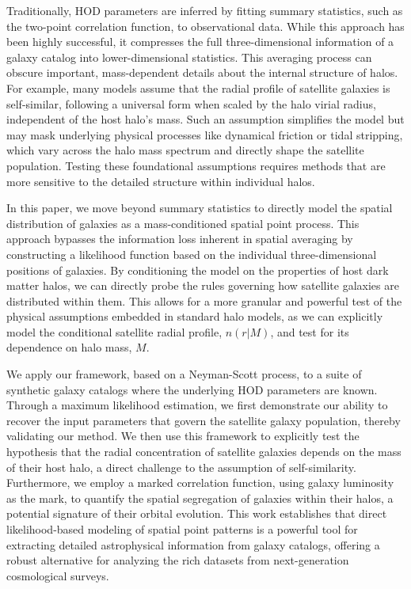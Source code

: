 \documentclass[]{article}
\begin{document}
Traditionally, HOD parameters are inferred by fitting summary statistics, such as the two-point correlation function, to observational data. While this approach has been highly successful, it compresses the full three-dimensional information of a galaxy catalog into lower-dimensional statistics. This averaging process can obscure important, mass-dependent details about the internal structure of halos. For example, many models assume that the radial profile of satellite galaxies is self-similar, following a universal form when scaled by the halo virial radius, independent of the host halo's mass. Such an assumption simplifies the model but may mask underlying physical processes like dynamical friction or tidal stripping, which vary across the halo mass spectrum and directly shape the satellite population. Testing these foundational assumptions requires methods that are more sensitive to the detailed structure within individual halos.

In this paper, we move beyond summary statistics to directly model the spatial distribution of galaxies as a mass-conditioned spatial point process. This approach bypasses the information loss inherent in spatial averaging by constructing a likelihood function based on the individual three-dimensional positions of galaxies. By conditioning the model on the properties of host dark matter halos, we can directly probe the rules governing how satellite galaxies are distributed within them. This allows for a more granular and powerful test of the physical assumptions embedded in standard halo models, as we can explicitly model the conditional satellite radial profile, $n(r|M)$, and test for its dependence on halo mass, $M$.

We apply our framework, based on a Neyman-Scott process, to a suite of synthetic galaxy catalogs where the underlying HOD parameters are known. Through a maximum likelihood estimation, we first demonstrate our ability to recover the input parameters that govern the satellite galaxy population, thereby validating our method. We then use this framework to explicitly test the hypothesis that the radial concentration of satellite galaxies depends on the mass of their host halo, a direct challenge to the assumption of self-similarity. Furthermore, we employ a marked correlation function, using galaxy luminosity as the mark, to quantify the spatial segregation of galaxies within their halos, a potential signature of their orbital evolution. This work establishes that direct likelihood-based modeling of spatial point patterns is a powerful tool for extracting detailed astrophysical information from galaxy catalogs, offering a robust alternative for analyzing the rich datasets from next-generation cosmological surveys.
\end{document}
